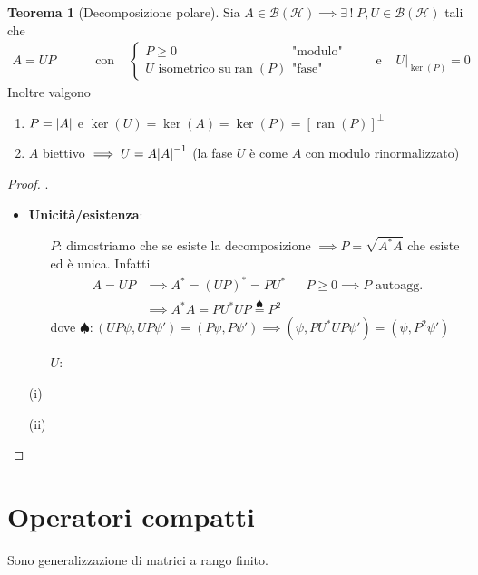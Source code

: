\documentclass[a4paper,10pt]{article}
\theoremstyle{definition}
\DeclareMathOperator*{\ran}{ran}
\newcommand{\hil}{\mathcal{H}} %
\theoremstyle{indentdefinition}
\theoremstyle{indenttheorem}
\newtheorem{thm}{Teorema}
\theoremstyle{myremark}
\theoremstyle{indentgeneral}
\newenvironment{myboxed} 
{\noindent\begin{lrbox}{\mybox}\begin{minipage}{\textwidth}}
{\end{minipage}\end{lrbox}\fbox{\usebox{\mybox}}}
\begin{document}
\begin{myboxed}
\begin{thm}[Decomposizione polare]
     Sia $A\in\mathcal{B}(\hil)\implies \exists\,!\; P,U\in \mathcal{B}(\hil)$ tali che
     \begin{align*}
         A=UP & \qquad\text{ con } & \begin{cases}
             P\ge 0 & \text{"modulo"}\\
             U \text{ isometrico su}\ran(P) & \text{"fase"}
         \end{cases} & \qquad\text{ e } & U|_{\ker(P)}=0
     \end{align*}
     Inoltre valgono
     \begin{enumerate}
         \item $P=\abs{A}$ e $\ker(U)=\ker(A)=\ker(P)=[\ran(P)]^\perp$
         \item $A$ biettivo $\implies U=A\abs{A}^{-1}$ (la fase $U$ è come $A$ con modulo rinormalizzato)
     \end{enumerate}
\end{thm}
\end{myboxed}
\begin{proof}
.
\begin{itemize}
    \item \textbf{Unicità/esistenza}:
    \begin{itemize}
        \item[$\boxed{P}$:] dimostriamo che se esiste la decomposizione $\implies P=\sqrt{A^*A}$ che esiste ed è unica. Infatti
        \begin{align*}
            A=UP  &\implies A^*=(UP)^*=PU^* &&\text{$P\ge0\implies P$ autoagg.}\\
            &\implies A^*A=PU^*UP\overset{\spadesuit}{=}P^2
        \end{align*}
        dove $\spadesuit: (UP\psi,UP\psi')=(P\psi,P\psi')\implies (\psi,PU^*UP\psi')=(\psi,P^2\psi')$
        \item[$\boxed{U}$:] \todo{}
    \end{itemize}
    \item[(i)]
    \item[(ii)]
\end{itemize}
\end{proof}

\pagebreak
\section{Operatori compatti}
Sono generalizzazione di matrici a rango finito.
\end{document}
